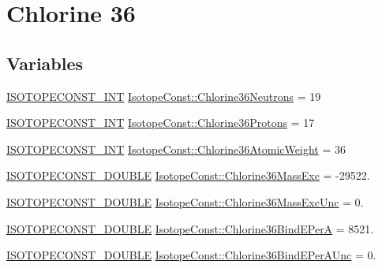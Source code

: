 \hypertarget{group___isotope_const-_chlorine-_cl36}{}\section{Chlorine 36}
\label{group___isotope_const-_chlorine-_cl36}
\subsection*{Variables}
\begin{DoxyCompactItemize}
\item 
\mbox{\hyperlink{group___isotope_const-_macros_ga5f18360b3e99483a35c32d789e62621c}{I\+S\+O\+T\+O\+P\+E\+C\+O\+N\+S\+T\+\_\+\+I\+NT}} \mbox{\hyperlink{group___isotope_const-_chlorine-_cl36_gaa9daecbf9bd6ea749b382d4da5b8e654}{Isotope\+Const\+::\+Chlorine36\+Neutrons}} = 19
\item 
\mbox{\hyperlink{group___isotope_const-_macros_ga5f18360b3e99483a35c32d789e62621c}{I\+S\+O\+T\+O\+P\+E\+C\+O\+N\+S\+T\+\_\+\+I\+NT}} \mbox{\hyperlink{group___isotope_const-_chlorine-_cl36_ga8a2187cb30de430d0941917b321285d7}{Isotope\+Const\+::\+Chlorine36\+Protons}} = 17
\item 
\mbox{\hyperlink{group___isotope_const-_macros_ga5f18360b3e99483a35c32d789e62621c}{I\+S\+O\+T\+O\+P\+E\+C\+O\+N\+S\+T\+\_\+\+I\+NT}} \mbox{\hyperlink{group___isotope_const-_chlorine-_cl36_gac8b704cea72e7d9b8537ae8b1b2752ce}{Isotope\+Const\+::\+Chlorine36\+Atomic\+Weight}} = 36
\item 
\mbox{\hyperlink{group___isotope_const-_macros_ga8f45a7272ce02c0b4c65c44636ed719a}{I\+S\+O\+T\+O\+P\+E\+C\+O\+N\+S\+T\+\_\+\+D\+O\+U\+B\+LE}} \mbox{\hyperlink{group___isotope_const-_chlorine-_cl36_ga04a2505373daa02fd8daa1fed55a5cab}{Isotope\+Const\+::\+Chlorine36\+Mass\+Exc}} = -\/29522.
\item 
\mbox{\hyperlink{group___isotope_const-_macros_ga8f45a7272ce02c0b4c65c44636ed719a}{I\+S\+O\+T\+O\+P\+E\+C\+O\+N\+S\+T\+\_\+\+D\+O\+U\+B\+LE}} \mbox{\hyperlink{group___isotope_const-_chlorine-_cl36_gad66276a13147f440c5dc2d5891a3c50c}{Isotope\+Const\+::\+Chlorine36\+Mass\+Exc\+Unc}} = 0.
\item 
\mbox{\hyperlink{group___isotope_const-_macros_ga8f45a7272ce02c0b4c65c44636ed719a}{I\+S\+O\+T\+O\+P\+E\+C\+O\+N\+S\+T\+\_\+\+D\+O\+U\+B\+LE}} \mbox{\hyperlink{group___isotope_const-_chlorine-_cl36_gab72eee739831499644ef8708d6d8a697}{Isotope\+Const\+::\+Chlorine36\+Bind\+E\+PerA}} = 8521.
\item 
\mbox{\hyperlink{group___isotope_const-_macros_ga8f45a7272ce02c0b4c65c44636ed719a}{I\+S\+O\+T\+O\+P\+E\+C\+O\+N\+S\+T\+\_\+\+D\+O\+U\+B\+LE}} \mbox{\hyperlink{group___isotope_const-_chlorine-_cl36_ga7baa8b52e71e9646d175b3866f6c09cb}{Isotope\+Const\+::\+Chlorine36\+Bind\+E\+Per\+A\+Unc}} = 0.

\end{DoxyCompactItemize}
